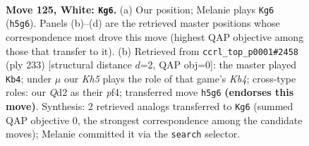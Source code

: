 \documentclass[11pt]{article}
\begin{document}
\begin{figure}[p]\centering
\begin{subfigure}{0.46\textwidth}\centering
\resizebox{\linewidth}{!}{%
\newchessgame
\chessboard[
  setfen={5k2/8/8/7K/8/8/3Q4/8 w - - 29 125},
  showmover=false,
  pgfstyle=straightmove, color=movearrow, markmove={h5-g6}
]}
\caption{}
\end{subfigure}\hfill
\begin{subfigure}{0.46\textwidth}\centering
\resizebox{\linewidth}{!}{%
\newchessgame
\chessboard[
  setfen={8/8/8/1k6/5P2/8/K7/8 b - - 5 117},
  showmover=false,
  pgfstyle=straightmove, color=movearrow, markmove={b5-b4}
]}
\caption{}
\end{subfigure}
\\[4pt]

\caption{\textbf{Move 125, White: \texttt{Kg6}.} (a) Our position; Melanie plays \texttt{Kg6} (\texttt{h5g6}). Panels (b)--(d) are the retrieved master positions whose correspondence most drove this move (highest QAP objective among those that transfer to it). (b) Retrieved from \texttt{ccrl\_top\_p0001\#2458} (ply 233) [structural distance $d$=2, QAP obj=0]: the master played \texttt{Kb4}; under $\mu$ our \emph{Kh5} plays the role of that game's \emph{Kb4}; cross-type roles: our \emph{Q}d2 as their \emph{p}f4; transferred move \texttt{h5g6} \textbf{(endorses this move)}. Synthesis: 2 retrieved analogs transferred to \texttt{Kg6} (summed QAP objective 0, the strongest correspondence among the candidate moves); Melanie committed it via the \texttt{search} selector.}
\label{fig:thought-m248}
\end{figure}
\end{document}
